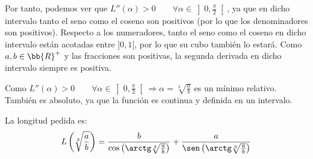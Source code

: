 \begin{ejercicio}
    Por tanto, podemos ver que $L''(\alpha) > 0 \qquad \forall \alpha \in \left]0, \frac{\pi}{2}\right[$, ya que en dicho intervalo tanto el seno como el coseno son positivos (por lo que los denominadores son positivos). Respecto a los numeradores, tanto el seno como el coseno en dicho intervalo están acotadas entre $]0, 1[$, por lo que su cubo también lo estará. Como $a,b\in \bb{R}^+$ y las fracciones son positivas, la segunda derivada en dicho intervalo siempre es positiva.

    Como $L''(\alpha) > 0 \qquad \forall \alpha \in \left]0, \frac{\pi}{2}\right[ \Longrightarrow \alpha = \sqrt[3]{\frac{a}{b}}$ es un mínimo relativo. También es absoluto, ya que la función es continua y definida en un intervalo.

    La longitud pedida es:
    \begin{equation*}
        L\left(\sqrt[3]{\frac{a}{b}}\right) = \frac{b}{\cos\left( \arctg \sqrt[3]{\frac{a}{b}}\right)} + \frac{a}{\sen \left( \arctg \sqrt[3]{\frac{a}{b}}\right)}
    \end{equation*}
\end{ejercicio}

